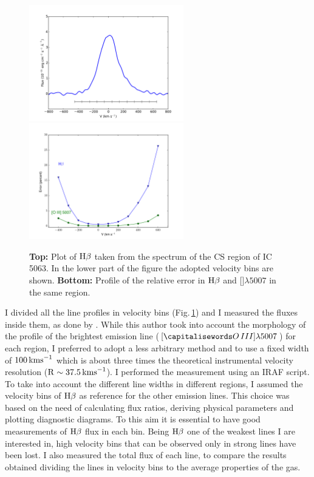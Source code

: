 \documentclass[../thesis.tex]{subfiles}
\begin{document}
\begin{figure}
\centering
\includegraphics[width=0.60\textwidth]{images/paper1/IC5063_bins.pdf} \\
\includegraphics[width=0.60\textwidth]{images/paper1/errors.pdf}
\caption[]{\textbf{Top:} Plot of $\Hb$ taken from the spectrum of the CS region of IC\,5063. In the lower part of the figure the adopted velocity bins are shown. \textbf{Bottom:} Profile of the relative error in $\Hb$ and []$\lambda5007$ in the same region.}
\label{fig:bins}
\end{figure}

I divided all the line profiles in velocity bins (Fig.\,\ref{fig:bins}) and I measured the fluxes inside them, as done by \citet{Ozaki09}.
While this author took into account the morphology of the profile of the brightest emission line ($[\ion{O}{III}]\lambda5007$) for each region, I preferred to adopt a less arbitrary method and to use a fixed width of $100\,\si{\kms}$ which is about three times the theoretical instrumental velocity resolution ($\rm R\sim 37.5\,\si{\kms}$).
I performed the measurement using an IRAF script. 
To take into account the different line widths in different regions, I assumed the velocity bins of $\Hb$ as reference for the other emission lines. 
This choice was based on the need of calculating flux ratios, deriving physical parameters and plotting diagnostic diagrams. 
To this aim it is essential to have good measurements of $\Hb$ flux in each bin. 
Being $\Hb$ one of the weakest lines I are interested in, high velocity bins that can be observed only in strong lines have been lost.
I also measured the total flux of each line, to compare the results obtained dividing the lines in velocity bins to the average properties of the gas.
\end{document}
